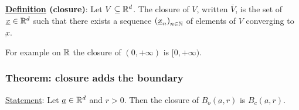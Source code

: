 \documentclass[10pt]{extarticle}
\renewcommand{\vec}[1]{\underbar{\ensuremath{#1}}}
\begin{document}
\textbf{\underline{Definition} (closure)}:
Let $V \subseteq \mathbb{R}^d$. The closure of $V$, written $\overline{V}$, is the set of $\vec{x} \in \R^d$ such that there exists a sequence $\left(\vec{x}_n\right)_{n \in \N}$ of elements of $V$ converging to $\vec{x}$.

For example on $\mathbb{R}$ the closure of $(0, +\infty)$ is $[0, +\infty)$.

                \subsubsection{Theorem: closure adds the boundary}

                \underline{Statement}: Let $\vec{a} \in \R^d$ and $r > 0$.
                Then the closure of $B_o(\vec{a}, r)$ is $B_c(\vec{a}, r)$.
\end{document}
